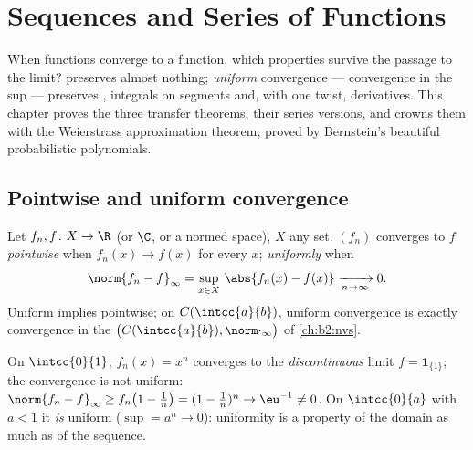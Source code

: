 \chapter{Sequences and Series of Functions}\label{ch:b2:funcseq}

When functions converge to a function, which properties survive the
passage to the limit?  preserves almost
nothing; \emph{uniform} convergence --- convergence in the sup 
--- preserves , integrals on segments and, with one twist,
derivatives. This chapter proves the three transfer theorems,
their series versions, and crowns them with the Weierstrass
approximation theorem, proved by Bernstein's beautiful probabilistic
polynomials.

\section{Pointwise and uniform convergence}

\begin{definition}\label{def:b2:funcseq:def}
Let $f_n, f \colon X \to \R$ (or $\C$, or a normed space), $X$ any
set. $(f_n)$ converges to $f$
\emph{pointwise} when $f_n(x) \to
f(x)$ for every $x$; \emph{uniformly}
when
\[
\norm{f_n - f}_\infty = \sup_{x \in X}\, \abs{f_n(x) - f(x)}
\xrightarrow[n \to \infty]{} 0 .
\]
Uniform implies pointwise; on $C(\intcc{a}{b})$, uniform convergence
is exactly convergence in the 
$\bigl(C(\intcc{a}{b}), \norm\cdot_\infty\bigr)$ of
\cref{ch:b2:nvs}.
\end{definition}

\begin{example}\label{ex:b2:funcseq:xn}
On $\intcc{0}{1}$, $f_n(x) = x^n$ converges  to the
\emph{discontinuous} limit $f = \mathbf{1}_{\{1\}}$; the convergence
is not uniform: $\norm{f_n - f}_\infty \geq f_n\bigl(1 -
\tfrac1n\bigr) = (1 - \tfrac1n)^n \to \eu^{-1} \neq 0$. On
$\intcc{0}{a}$ with $a < 1$ it \emph{is} uniform ($\sup = a^n \to
0$): uniformity is a property of the domain as much as of the
sequence.
\end{example}

